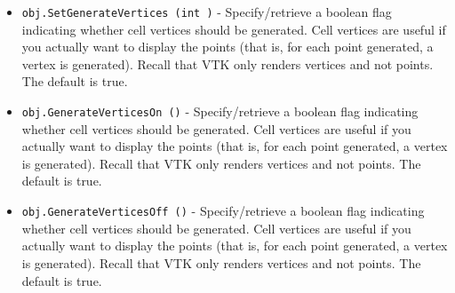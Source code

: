 \begin{itemize}
\item  \verb|obj.SetGenerateVertices (int )| -  Specify/retrieve a boolean flag indicating whether cell vertices should
 be generated. Cell vertices are useful if you actually want to display
 the points (that is, for each point generated, a vertex is generated).
 Recall that VTK only renders vertices and not points. 
 The default is true.

\item  \verb|obj.GenerateVerticesOn ()| -  Specify/retrieve a boolean flag indicating whether cell vertices should
 be generated. Cell vertices are useful if you actually want to display
 the points (that is, for each point generated, a vertex is generated).
 Recall that VTK only renders vertices and not points. 
 The default is true.

\item  \verb|obj.GenerateVerticesOff ()| -  Specify/retrieve a boolean flag indicating whether cell vertices should
 be generated. Cell vertices are useful if you actually want to display
 the points (that is, for each point generated, a vertex is generated).
 Recall that VTK only renders vertices and not points. 
 The default is true.

\end{itemize}
